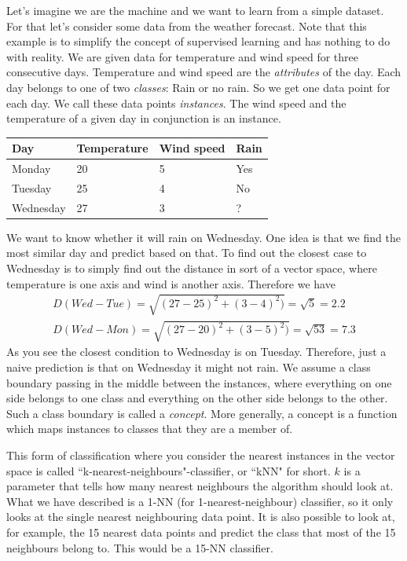 \documentclass[10pt,a4paper]{article}
\begin{document}
Let's imagine we are the machine and we want to learn from a simple dataset.
For that let's consider some data from the weather forecast. Note that this example is to simplify the concept of supervised learning and has nothing to do with reality.
We are given data for temperature and wind speed for three consecutive days. Temperature and wind speed are the \textit{attributes} of the day. Each day belongs to one of two \textit{classes}: Rain or no rain. So we get one data point for each day. We call these data points \textit{instances}. The wind speed and the temperature of a given day in conjunction is an instance.


\begin{longtable}{|l|l|l|l|}
\hline
Day & Temperature & Wind speed & Rain \\ \hline

 Monday& 20 &5&Yes  \\ \hline
Tuesday & 25 & 4 &No\\ \hline
Wednesday &27  & 3&? \\ \hline
\end{longtable}
We want to know whether it will rain on Wednesday. One idea is that we find the most similar day and predict based on that. To find out the closest case to Wednesday is to simply find out the distance in sort of a vector space, where temperature is one axis and wind is another axis.
Therefore we have
\begin{align}\nonumber
D(Wed-Tue)=\sqrt{(27-25)^2+(3-4)^2)}=\sqrt{5}=2.2\\
D(Wed-Mon)=\sqrt{(27-20)^2+(3-5)^2)}=\sqrt{53}=7.3
\end{align}
As you see the closest condition to Wednesday is on Tuesday. Therefore, just a naive prediction is that on Wednesday it might not rain. We assume a class boundary passing in the middle between the instances, where everything on one side belongs to one class and everything on the other side belongs to the other. Such a class boundary is called a \textit{concept}. More generally, a concept is a function which maps instances to classes that they are a member of. 

This form of classification where you consider the nearest instances in the vector space is called ``k-nearest-neighbours"-classifier, or ``kNN" for short. $k$ is a parameter that tells how many nearest neighbours the algorithm should look at. What we have described is a 1-NN (for 1-nearest-neighbour) classifier, so it only looks at the single nearest neighbouring data point. It is also possible to look at, for example, the 15 nearest data points and predict the class that most of the 15 neighbours belong to. This would be a 15-NN classifier.
\end{document}
